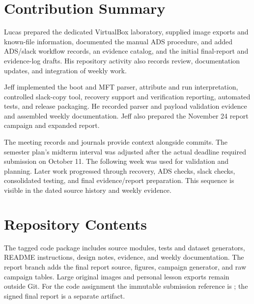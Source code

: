 

\section{Contribution Summary}
Lucas prepared the dedicated VirtualBox laboratory, supplied image exports
and known-file information, documented the manual ADS procedure, and added
ADS/slack workflow records, an evidence catalog, and the initial final-report
and evidence-log drafts. His repository activity also records review,
documentation updates, and integration of weekly work.

Jeff implemented the boot and MFT parser, attribute and run interpretation,
controlled slack-copy tool, recovery support and verification reporting,
automated tests, and release packaging. He recorded parser and payload
validation evidence and assembled weekly documentation. Jeff also prepared
the November 24 report campaign and expanded report.

The meeting records and journals provide context alongside commits. The
semester plan's midterm interval was adjusted after the actual deadline
required submission on October 11. The following week was used for validation
and planning. Later work progressed through recovery, ADS checks, slack
checks, consolidated testing, and final evidence/report preparation. This
sequence is visible in the dated source history and weekly evidence.

\section{Repository Contents}
The tagged code package includes source modules, tests and dataset generators,
README instructions, design notes, evidence, and weekly documentation. The
report branch adds the final report source, figures, campaign generator, and
raw campaign tables. Large original images and personal lesson exports
remain outside Git. For the code assignment the immutable submission
reference is ; the signed final report is a separate artifact.
